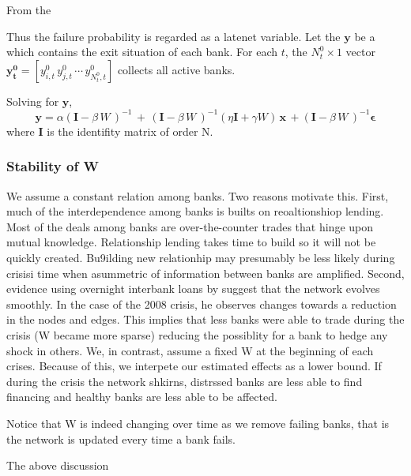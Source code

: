 \documentclass[11pt,final]{article}%
\newcommand{\vect}[1]{\bm{#1}}
\begin{document}
From the 


Thus the failure probability is regarded as a latenet variable.
Let the  $\vect{y}$ be a  which contains the exit situation of each bank. 
For each $t$, the $N^{0}_{t} \times 1$ vector $\vect{y^{0}_{t}} = [y^{0}_{i, t} \, y^{0}_{j, t} \, \cdots \,  y^{0}_{N_{t}^{0}, t} ]$ collects all active banks. 


Solving for $\vect{y}$,
\begin{equation}
\vect{y} = \alpha (\vect{I} - \beta \, W \, )^{-1} \,+\, (\vect{I} - \beta \, W\, )^{-1} (\eta \vect{I} + \gamma W) \, \vect{x}\,  + (\vect{I} - \beta \, W\, )^{-1} \vect{\epsilon}
\end{equation}
where $\vect{I}$ is the identifity matrix of order N.


\subsubsection{Stability of W}
We assume a constant relation among banks. Two reasons motivate this. First, much of the interdependence among banks is builts on reoaltionshiop lending. Most of the deals among banks are over-the-counter trades that hinge upon mutual knowledge. Relationship lending takes time to build so it will not be quickly created. Bu9ilding new relationhip may presumably be less likely during crisisi time when asummetric of information between banks are amplified.  
Second, evidence using overnight interbank loans by \cite{Forte2020} suggest that the network evolves smoothly. In the case of the 2008 crisis, he observes changes towards a reduction in the nodes and edges.  This implies that less banks were able to trade during the crisis (W became more sparse) reducing the possiblity for a bank to hedge any shock in others. 
We, in contrast, assume a fixed W at the beginning of each crises. Because of this, we interpete our estimated effects as a lower bound. If during the crisis the network shkirns, distrssed banks are less able to find financing and healthy banks are less able to be affected. 

Notice that W is indeed changing over time as we remove failing banks, that is the network is updated every time a bank fails. 





The above discussion
\end{document}
